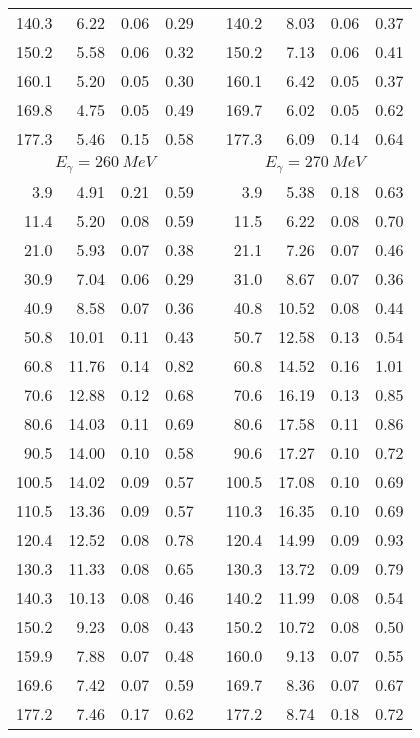 \begin{table}[htbp]
\begin{center}
\begin{tabular}{|r|r|c|c|l|r|r|c|c|}
140.3 &  6.22 &  0.06 &  0.29 & & 140.2 &  8.03 &  0.06 &  0.37 \\ 
150.2 &  5.58 &  0.06 &  0.32 & & 150.2 &  7.13 &  0.06 &  0.41 \\ 
160.1 &  5.20 &  0.05 &  0.30 & & 160.1 &  6.42 &  0.05 &  0.37 \\ 
169.8 &  4.75 &  0.05 &  0.49 & & 169.7 &  6.02 &  0.05 &  0.62 \\ 
177.3 &  5.46 &  0.15 &  0.58 & & 177.3 &  6.09 &  0.14 &  0.64 \\ 
\hline 
\hline 
\multicolumn{4}{|c|}{ $E_{\gamma}=260~MeV$} & & 
\multicolumn{4}{c|}{ $E_{\gamma}=270~MeV$} \\ 
\cline{1-4} 
\cline{6-9} 
  3.9 &  4.91 &  0.21 &  0.59 & &   3.9 &  5.38 &  0.18 &  0.63 \\ 
 11.4 &  5.20 &  0.08 &  0.59 & &  11.5 &  6.22 &  0.08 &  0.70 \\ 
 21.0 &  5.93 &  0.07 &  0.38 & &  21.1 &  7.26 &  0.07 &  0.46 \\ 
 30.9 &  7.04 &  0.06 &  0.29 & &  31.0 &  8.67 &  0.07 &  0.36 \\ 
 40.9 &  8.58 &  0.07 &  0.36 & &  40.8 & 10.52 &  0.08 &  0.44 \\ 
 50.8 & 10.01 &  0.11 &  0.43 & &  50.7 & 12.58 &  0.13 &  0.54 \\ 
 60.8 & 11.76 &  0.14 &  0.82 & &  60.8 & 14.52 &  0.16 &  1.01 \\ 
 70.6 & 12.88 &  0.12 &  0.68 & &  70.6 & 16.19 &  0.13 &  0.85 \\ 
 80.6 & 14.03 &  0.11 &  0.69 & &  80.6 & 17.58 &  0.11 &  0.86 \\ 
 90.5 & 14.00 &  0.10 &  0.58 & &  90.6 & 17.27 &  0.10 &  0.72 \\ 
100.5 & 14.02 &  0.09 &  0.57 & & 100.5 & 17.08 &  0.10 &  0.69 \\ 
110.5 & 13.36 &  0.09 &  0.57 & & 110.3 & 16.35 &  0.10 &  0.69 \\ 
120.4 & 12.52 &  0.08 &  0.78 & & 120.4 & 14.99 &  0.09 &  0.93 \\ 
130.3 & 11.33 &  0.08 &  0.65 & & 130.3 & 13.72 &  0.09 &  0.79 \\ 
140.3 & 10.13 &  0.08 &  0.46 & & 140.2 & 11.99 &  0.08 &  0.54 \\ 
150.2 &  9.23 &  0.08 &  0.43 & & 150.2 & 10.72 &  0.08 &  0.50 \\ 
159.9 &  7.88 &  0.07 &  0.48 & & 160.0 &  9.13 &  0.07 &  0.55 \\ 
169.6 &  7.42 &  0.07 &  0.59 & & 169.7 &  8.36 &  0.07 &  0.67 \\ 
177.2 &  7.46 &  0.17 &  0.62 & & 177.2 &  8.74 &  0.18 &  0.72 \\ 
\cline{1-4} 
\cline{6-9} 
\end{tabular} 

\end{center} 
\end{table}
